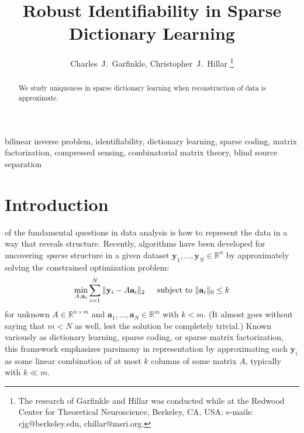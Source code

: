 \documentclass[journal, onecolumn]{IEEEtran}
\begin{document}
\title{Robust Identifiability in Sparse Dictionary Learning}

\author{Charles~J.~Garfinkle,  Christopher~J.~Hillar%
\thanks{The research of Garfinkle and Hillar was conducted while at the Redwood Center for Theoretical Neuroscience, Berkeley, CA, USA; e-mails: cjg@berkeley.edu, chillar@msri.org.}}%

\maketitle

\begin{abstract}
We study uniqueness in sparse dictionary learning when reconstruction of data is approximate.
\end{abstract}

\begin{IEEEkeywords}
bilinear inverse problem, identifiability, dictionary learning, sparse coding, matrix factorization, compressed sensing, combinatorial matrix theory, blind source separation
\end{IEEEkeywords}


\section{Introduction}

 of the fundamental questions in data analysis is how to represent the data in a way that reveals structure. Recently, algorithms have been developed for uncovering \emph{sparse} structure in a given dataset $\mathbf{y}_1, \ldots, \mathbf{y}_N \in \mathbb{R}^n$ by approximately solving the constrained optimization problem:
\begin{align}\label{DictionaryLearning}
\min_{A, \mathbf{a}_i} \sum_{i=1}^N \|\mathbf{y}_i - A\mathbf{a}_i\|_2 \indent \text{subject to } \|\mathbf{a}_i\|_0 \leq k 
\end{align}
%
for unknown $A \in \mathbb{R}^{n \times m}$ and $\mathbf{a}_1, \ldots, \mathbf{a}_N \in \mathbb{R}^m$ with $k < m$. (It almost goes without saying that $m < N$ as well, lest the solution be completely trivial.) Known variously as dictionary learning, sparse coding, or sparse matrix factorization, this framework emphasizes parsimony in representation by approximating each $\mathbf{y}_i$ as some linear combination of at most $k$ columns of some matrix $A$, typically with $k \ll m$. 
\end{document}
